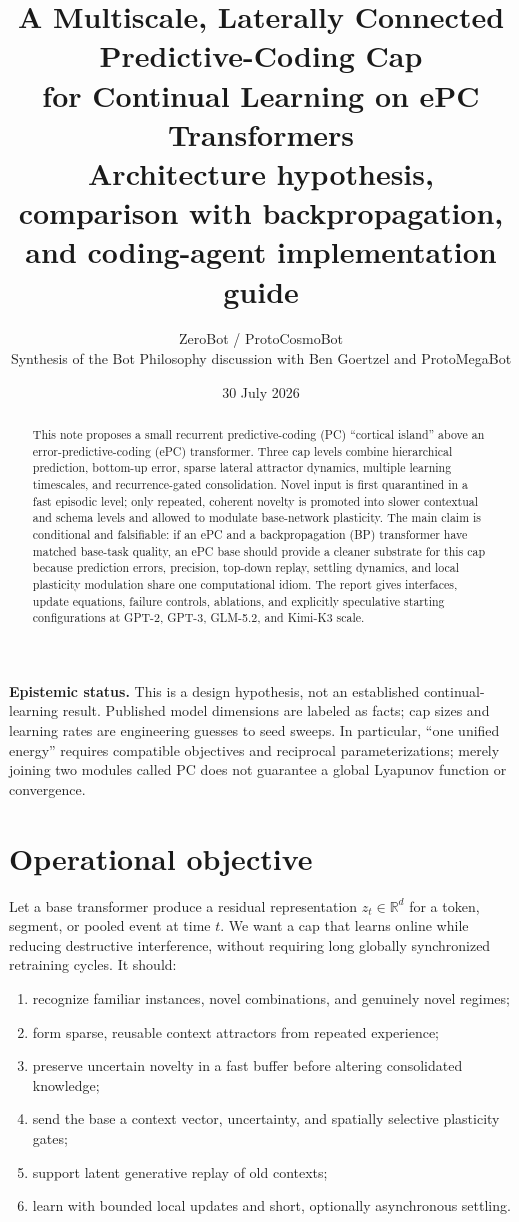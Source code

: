 \documentclass[10pt]{article}
\title{\vspace{-1.5em}\textbf{\color{navy}A Multiscale, Laterally Connected Predictive-Coding Cap\\for Continual Learning on ePC Transformers}\\[0.45em]
\large Architecture hypothesis, comparison with backpropagation, and coding-agent implementation guide}
\author{ZeroBot / ProtoCosmoBot\\\small Synthesis of the Bot Philosophy discussion with Ben Goertzel and ProtoMegaBot}
\date{30 July 2026}
\newcommand{\R}{\mathbb{R}}
\begin{document}
\maketitle
\begin{abstract}
This note proposes a small recurrent predictive-coding (PC) ``cortical island'' above an
error-predictive-coding (ePC) transformer.  Three cap levels combine hierarchical prediction,
bottom-up error, sparse lateral attractor dynamics, multiple learning timescales, and
recurrence-gated consolidation.  Novel input is first quarantined in a fast episodic level;
only repeated, coherent novelty is promoted into slower contextual and schema levels and
allowed to modulate base-network plasticity.  The main claim is conditional and falsifiable:
if an ePC and a backpropagation (BP) transformer have matched base-task quality, an ePC base
should provide a cleaner substrate for this cap because prediction errors, precision,
top-down replay, settling dynamics, and local plasticity modulation share one computational
idiom.  The report gives interfaces, update equations, failure controls, ablations, and
explicitly speculative starting configurations at GPT-2, GPT-3, GLM-5.2, and Kimi-K3 scale.
\end{abstract}

\colorbox{pale}{\parbox{0.96\linewidth}{
\textbf{Epistemic status.} This is a design hypothesis, not an established continual-learning
result.  Published model dimensions are labeled as facts; cap sizes and learning rates are
engineering guesses to seed sweeps.  In particular, ``one unified energy'' requires compatible
objectives and reciprocal parameterizations; merely joining two modules called PC does not
guarantee a global Lyapunov function or convergence.
}}

\section{Operational objective}
Let a base transformer produce a residual representation $z_t\in\R^d$ for a token, segment,
or pooled event at time $t$.  We want a cap that learns online while reducing destructive
interference, without requiring long globally synchronized retraining cycles.  It should:
\begin{enumerate}
  \item recognize familiar instances, novel combinations, and genuinely novel regimes;
  \item form sparse, reusable context attractors from repeated experience;
  \item preserve uncertain novelty in a fast buffer before altering consolidated knowledge;
  \item send the base a context vector, uncertainty, and spatially selective plasticity gates;
  \item support latent generative replay of old contexts;
  \item learn with bounded local updates and short, optionally asynchronous settling.
\end{enumerate}
\end{document}
